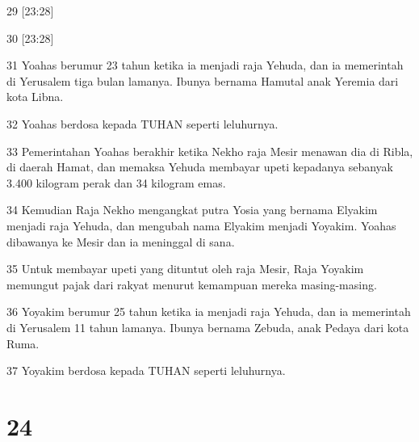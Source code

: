 \par 29 [23:28]
\par 30 [23:28]
\par 31 Yoahas berumur 23 tahun ketika ia menjadi raja Yehuda, dan ia memerintah di Yerusalem tiga bulan lamanya. Ibunya bernama Hamutal anak Yeremia dari kota Libna.
\par 32 Yoahas berdosa kepada TUHAN seperti leluhurnya.
\par 33 Pemerintahan Yoahas berakhir ketika Nekho raja Mesir menawan dia di Ribla, di daerah Hamat, dan memaksa Yehuda membayar upeti kepadanya sebanyak 3.400 kilogram perak dan 34 kilogram emas.
\par 34 Kemudian Raja Nekho mengangkat putra Yosia yang bernama Elyakim menjadi raja Yehuda, dan mengubah nama Elyakim menjadi Yoyakim. Yoahas dibawanya ke Mesir dan ia meninggal di sana.
\par 35 Untuk membayar upeti yang dituntut oleh raja Mesir, Raja Yoyakim memungut pajak dari rakyat menurut kemampuan mereka masing-masing.
\par 36 Yoyakim berumur 25 tahun ketika ia menjadi raja Yehuda, dan ia memerintah di Yerusalem 11 tahun lamanya. Ibunya bernama Zebuda, anak Pedaya dari kota Ruma.
\par 37 Yoyakim berdosa kepada TUHAN seperti leluhurnya.

\chapter{24}

